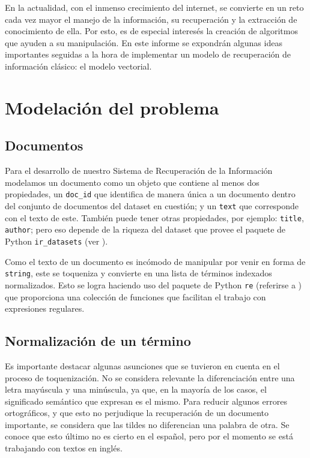 \documentclass{llncs}
\begin{document}
	En la actualidad, con el inmenso crecimiento del internet, se convierte en un reto cada vez mayor el manejo de la información, su recuperaci\'on y la extracci\'on de conocimiento de ella. Por esto, es de especial interes\'es la creaci\'on de algoritmos que ayuden a su manipulaci\'on. En este informe se expondr\'an algunas ideas importantes seguidas a la hora de implementar un modelo de recuperaci\'on de informaci\'on cl\'asico: el modelo vectorial.
	
	\section{Modelaci\'on del problema}
	
	\subsection{Documentos}
	Para el desarrollo de nuestro Sistema de Recuperaci\'on de la Informaci\'on modelamos un documento como un objeto que contiene al menos dos propiedades, un \texttt{doc\_id} que identifica de manera \'unica a un documento dentro del conjunto de documentos del dataset en cuesti\'on; y un \texttt{text} que corresponde con el texto de este. Tambi\'en puede tener otras propiedades, por ejemplo: \texttt{title}, \texttt{author}; pero eso depende de la riqueza del dataset que provee el paquete de Python \texttt{ir\_datasets} (ver \cite{B3}).
	
	Como el texto de un documento es inc\'omodo de manipular por venir en forma de \texttt{string}, este se toqueniza y convierte en una lista de t\'erminos indexados normalizados. Esto se logra haciendo uso del paquete de Python \texttt{re} (referirse a \cite{B4}) que proporciona una colecci\'on de funciones que facilitan el trabajo con expresiones regulares. 
	
	\subsection{Normalizaci\'on de un t\'ermino}
	
	Es importante destacar algunas asunciones que se tuvieron en cuenta en el proceso de toquenizaci\'on. No se considera relevante la diferenciación entre una letra may\'uscula y una min\'uscula, ya que, en la mayoría de los casos, el significado sem\'antico que expresan es el mismo. Para reducir algunos errores ortográficos, y que esto no perjudique la recuperaci\'on de un documento importante, se considera que las tildes no diferencian una palabra de otra. Se conoce que esto \'ultimo no es cierto en el español, pero por el momento se est\'a trabajando con textos en ingl\'es.
	
\end{document}
